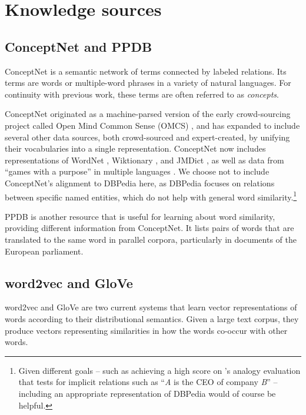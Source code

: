 \documentclass[11pt,letterpaper]{article}
\begin{document}
\section{Knowledge sources}

\subsection{ConceptNet and PPDB}
ConceptNet \cite{speer2012conceptnet} is a semantic network of terms
connected by labeled relations. Its terms are words or multiple-word phrases
in a variety of natural languages. For continuity with previous work,
these terms are often referred to as {\em concepts}.

ConceptNet originated as a machine-parsed version of the early crowd-sourcing
project called Open Mind Common Sense (OMCS) \cite{singh2002omcs}, and has expanded
to include several other data sources, both crowd-sourced and expert-created,
by unifying their vocabularies into a single representation. ConceptNet now includes
representations of WordNet \cite{miller1998wordnet}, Wiktionary \cite{wiktionary2014en},
and JMDict \cite{breen2004jmdict}, as well as data from ``games with a purpose'' in
multiple languages \cite{vonahn2006verbosity} \cite{kuo2009petgame}
\cite{nakahara2011nadya}. We choose not to include ConceptNet's alignment to DBPedia
here, as DBPedia focuses on relations between specific named entities, which do not help
with general word similarity.\footnote{
    Given different goals -- such as achieving a high score on
    's analogy evaluation that tests for
    implicit relations such as ``{\em A} is the CEO of company {\em B}'' --
    including an appropriate representation of DBPedia would of course be helpful.
}

PPDB \cite{ganitkevitch2013ppdb} is another resource that is useful for
learning about word similarity, providing different information from
ConceptNet. It lists pairs of words that are translated to the same word in parallel
corpora, particularly in documents of the European parliament.

\subsection{word2vec and GloVe}

word2vec and GloVe are two current systems that learn vector representations
of words according to their distributional semantics. Given a large text corpus,
they produce vectors representing similarities in how the words co-occur with
other words.
\end{document}
